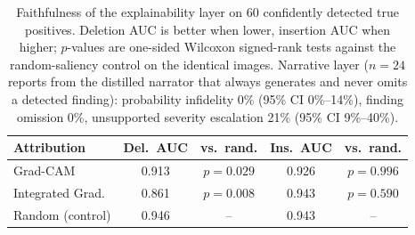 \begin{table}[!t]
\centering
\caption{Faithfulness of the explainability layer on 60 confidently detected true
positives. Deletion AUC is better when lower, insertion AUC when higher; $p$-values are one-sided
Wilcoxon signed-rank tests against the random-saliency control on the identical images.
Narrative layer ($n{=}24$ reports from the distilled narrator that always generates and never omits a detected finding): probability infidelity 0\% (95\% CI 0\%--14\%), finding omission 0\%, unsupported severity escalation 21\% (95\% CI 9\%--40\%).}
\label{tab:explain}
\scriptsize
\setlength{\tabcolsep}{3.5pt}
\begin{tabular}{lcccc}
\toprule
Attribution & Del.\ AUC & vs.\ rand. & Ins.\ AUC & vs.\ rand. \\
\midrule
Grad-CAM & 0.913 & $p=0.029$ & 0.926 & $p=0.996$ \\
Integrated Grad. & 0.861 & $p=0.008$ & 0.943 & $p=0.590$ \\
Random (control) & 0.946 & -- & 0.943 & -- \\
\bottomrule
\end{tabular}
\end{table}
